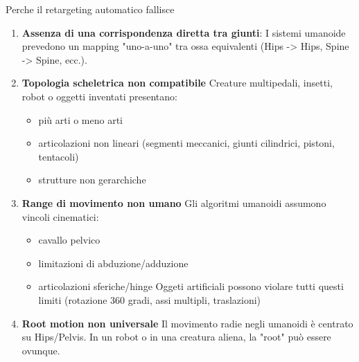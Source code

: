 Perche il retargeting automatico fallisce
\begin{enumerate}
    \item \textbf{Assenza di una corrispondenza diretta tra giunti}: 
    I sistemi umanoide prevedono un mapping "uno-a-uno" tra ossa equivalenti (Hips -> Hips, Spine -> Spine, ecc.).
    
    \item \textbf{Topologia scheletrica non compatibile}
    Creature multipedali, insetti, robot o oggetti inventati presentano:
    \begin{itemize}
        \item più arti o meno arti
        \item articolazioni non lineari (segmenti meccanici, giunti cilindrici, pistoni, tentacoli)
        \item strutture non gerarchiche
    \end{itemize}
    \item \textbf{Range di movimento non umano}
    Gli algoritmi umanoidi assumono vincoli cinematici:
    \begin{itemize}
        \item cavallo pelvico
        \item limitazioni di abduzione/adduzione
        \item articolazioni sferiche/hinge
            Oggeti artificiali possono violare tutti questi limiti (rotazione 360 gradi, assi multipli, traslazioni)
    \end{itemize}
    \item \textbf{Root motion non universale}
    Il movimento radie negli umanoidi è centrato su Hips/Pelvis. In un robot o in una creatura aliena, la "root" può essere ovunque.
\end{enumerate}


